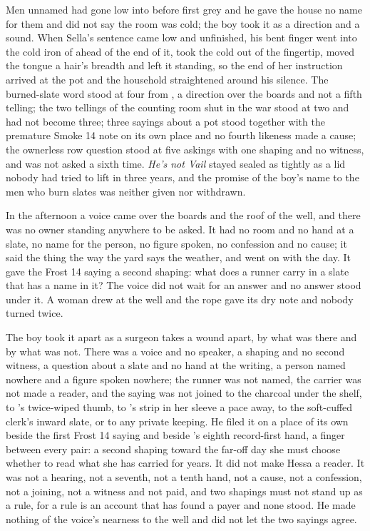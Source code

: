 Men unnamed had gone low into  before first grey and he gave the house no name for them and did not say the room was cold; the boy took it as a direction and a sound. When Sella's sentence came low and unfinished, his bent finger went into the cold iron of  ahead of the end of it, took the cold out of the fingertip, moved the tongue a hair's breadth and left it standing, so the end of her instruction arrived at the pot and the household straightened around his silence. The burned-slate word stood at four from , a direction over the boards and not a fifth telling; the two tellings of the counting room shut in the war stood at two and had not become three; three sayings about a pot stood together with the premature Smoke 14 note on its own place and no fourth likeness made a cause; the ownerless row question stood at five askings with one shaping and no witness, and was not asked a sixth time. \emph{He's not Vail} stayed sealed as tightly as a lid nobody had tried to lift in three years, and the promise of the boy's name to the men who burn slates was neither given nor withdrawn.

\scenebreak

In the afternoon a voice came over the boards and the roof of the well, and there was no owner standing anywhere to be asked. It had no room and no hand at a slate, no name for the person, no figure spoken, no confession and no cause; it said the thing the way the yard says the weather, and went on with the day. It gave the Frost 14 saying a second shaping: what does a runner carry in a slate that has a name in it? The voice did not wait for an answer and no answer stood under it. A woman drew at the well and the rope gave its dry note and nobody turned twice.

The boy took it apart as a surgeon takes a wound apart, by what was there and by what was not. There was a voice and no speaker, a shaping and no second witness, a question about a slate and no hand at the writing, a person named nowhere and a figure spoken nowhere; the runner was not named, the carrier was not made a reader, and the saying was not joined to the charcoal under the shelf, to 's twice-wiped thumb, to 's strip in her sleeve a pace away, to the soft-cuffed clerk's inward slate, or to any private keeping. He filed it on a place of its own beside the first Frost 14 saying and beside 's eighth record-first hand, a finger between every pair: a second shaping toward the far-off day she must choose whether to read what she has carried for years. It did not make Hessa a reader. It was not a hearing, not a seventh, not a tenth hand, not a cause, not a confession, not a joining, not a witness and not paid, and two shapings must not stand up as a rule, for a rule is an account that has found a payer and none stood. He made nothing of the voice's nearness to the well and did not let the two sayings agree.

